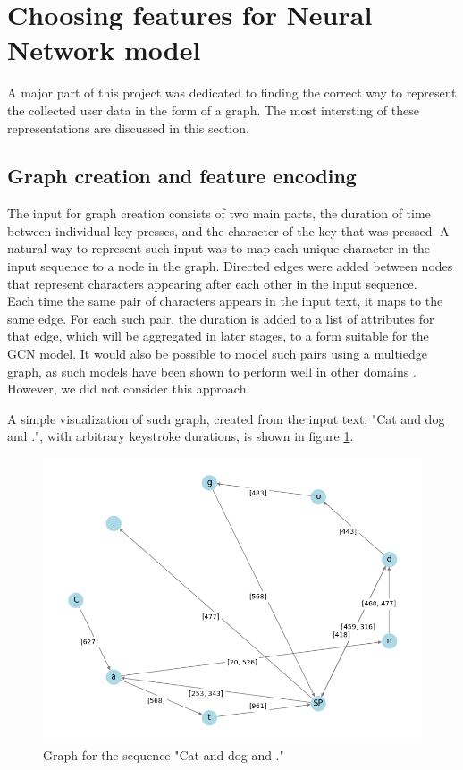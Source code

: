 
\section{Choosing features for Neural Network model}
A major part of this project was dedicated to finding the correct way to represent the collected user data in the form of a graph. The most intersting of these representations are discussed in this section.


\subsection{Graph creation and feature encoding}
The input for graph creation consists of two main parts, the duration of time between individual key presses, and the character of the key that was pressed.
A natural way to represent such input was to map each unique character in the input sequence to a node in the graph. 
Directed edges were added between nodes that represent characters appearing after each other in the input sequence. \\
Each time the same pair of characters appears in the input text, it maps to the same edge. For each such pair, the duration is added to a list of attributes for that edge, which will be aggregated in later stages, to a form suitable for the GCN model. It would also be possible to model such pairs using a multiedge graph, as such models have been shown to perform well in other domains . However, we did not consider this approach. 

A simple visualization of such graph, created from the input text: "Cat and dog and .", with arbitrary keystroke durations, is shown in figure \ref{fig:example_graph}.

\begin{figure}[H]
	\centering
	\includegraphics[width=.65\textwidth]{images/graph_with_edge.png} 	
	\caption{Graph for the sequence "Cat and dog and ."}
	\label{fig:example_graph}
\end{figure}


